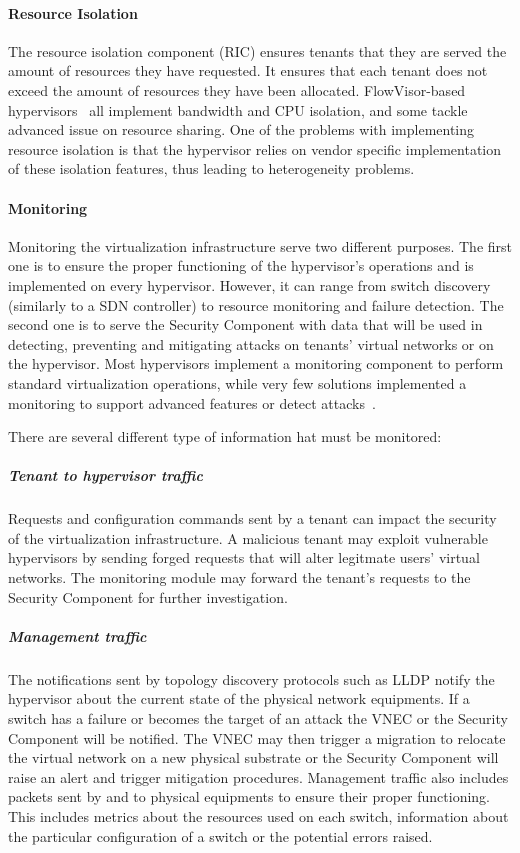 \paragraph{Resource Isolation}
The resource isolation component (RIC) ensures tenants that they are served the amount of resources they have requested.
It ensures that each tenant does not exceed the amount of resources they have been allocated.
FlowVisor-based hypervisors~\cite{FlowVisor-Sherwood2009,ADVisor-Salvadori2012,VeRTIGO-Corin2012a,EnhancedFV-Min2012,SlicesIsolator-El-Azzab2011,DoubleFV-Yin2013} all implement bandwidth and CPU isolation, and some tackle advanced issue on resource sharing. One of the problems with implementing resource isolation is that the hypervisor relies on vendor specific implementation of these isolation features, thus leading to heterogeneity problems.


\paragraph{Monitoring}
Monitoring the virtualization infrastructure serve two different purposes.
The first one is to ensure the proper functioning of the hypervisor's operations and is implemented on every hypervisor. However, it can range from switch discovery (similarly to a SDN controller) to resource monitoring and failure detection.
The second one is to serve the Security Component with data that will be used in detecting, preventing and mitigating attacks on tenants' virtual networks or on the hypervisor.
Most hypervisors implement a monitoring component to perform standard virtualization operations, while very few solutions implemented a monitoring to support advanced features or detect attacks~\cite{VeRTIGO-Corin2012a,CoVisor-Jin2015,FlowN-Drutskoy2012,AutoSlice-Bozakov2012,NVP-Koponen2014,ONVisor-Han2018}.

There are several different type of information hat must be monitored:

\subparagraph{Tenant to hypervisor traffic} Requests and configuration commands sent by a tenant can impact the security of the virtualization infrastructure. A malicious tenant may exploit vulnerable hypervisors by sending forged requests that will alter legitmate users' virtual networks. The monitoring module may forward the tenant's requests to the Security Component for further investigation.

\subparagraph{Management traffic} 
The notifications sent by topology discovery protocols such as LLDP notify the hypervisor about the current state of the physical network equipments. If a switch has a failure or becomes the target of an attack the VNEC or the Security Component will be notified. The VNEC may then trigger a migration to relocate the virtual network on a new physical substrate or the Security Component will raise an alert and trigger mitigation procedures.
Management traffic also includes packets sent by and to physical equipments to ensure their proper functioning.
This includes metrics about the resources used on each switch, information about the particular configuration of a switch or the potential errors raised.

